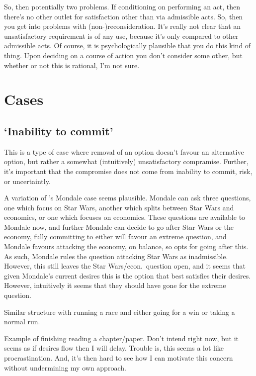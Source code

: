 \documentclass[10pt]{article}
\begin{document}
So, then potentially two problems.
If conditioning on performing an act, then there's no other outlet for satisfaction other than via admissible acts.
So, then you get into problems with (non-)reconsideration.
It's really not clear that an unsatisfactory requirement is of any use, because it's only compared to other admissible acts.
Of course, it is psychologically plausible that you do this kind of thing.
Upon deciding on a course of action you don't consider some other, but whether or not this is rational, I'm not sure.

\section{Cases}
\label{sec:cases}

\subsection{`Inability to commit'}
\label{sec:inability-commit}

This is a type of case where removal of an option doesn't favour an alternative option, but rather a somewhat (intuitively) unsatisfactory compramise.
Further, it's important that the compromise does not come from inability to commit, risk, or uncertaintly.

A variation of \citeauthor{Bratman:1987aa}'s Mondale case seems plausible.
Mondale can ask three questions, one which focus on Star Wars, another which splits between Star Wars and economics, or one which focuses on economics.
These questions are available to Mondale now, and further Mondale can decide to go after Star Wars or the economy, fully committing to either will favour an extreme question, and Mondale favours attacking the economy, on balance, so opts for going after this.
As such, Mondale rules the question attacking Star Wars as inadmissible.
However, this still leaves the Star Wars/econ.\ question open, and it seems that given Mondale's current desires this is the option that best satisfies their desires.
However, intuitively it seems that they should have gone for the extreme question.

Similar structure with running a race and either going for a win or taking a normal run.

Example of finishing reading a chapter/paper.
Don't intend right now, but it seems as if desires flow then I will delay.
Trouble is, this seems a lot like procrastination.
And, it's then hard to see how I can motivate this concern without undermining my own approach.
\end{document}
